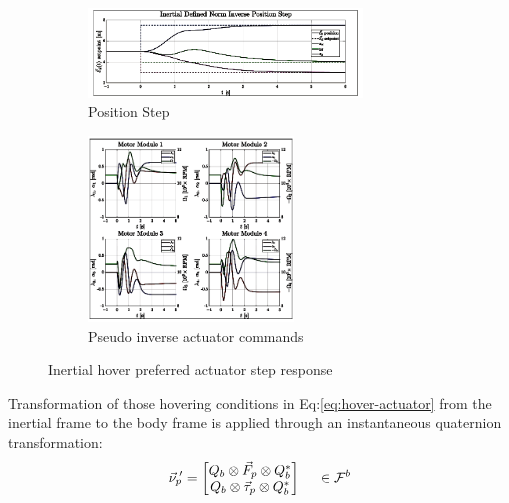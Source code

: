 \begin{figure}[htbp]
\ContinuedFloat
\begin{subfigure}{\textwidth}
\vspace{-2pt}
\centering
\includegraphics[width=0.8\textwidth]{graphs/inertial_norm_position}
\vspace{-6pt}
\caption{Position Step}
\label{fig:inertia_norm_position}
\end{subfigure}
\begin{subfigure}{\textwidth}
\centering
\includegraphics[width=0.6\textwidth]{graphs/inertial_norm_input}
\vspace{-6pt}
\caption{Pseudo inverse actuator commands}
\label{fig:inertia_norm_input}
\end{subfigure}
\vspace{-10pt}
\caption{Inertial hover preferred actuator step response}
\label{fig:inertial-norm-step}
\vspace{-6pt}
\end{figure}
\par
Transformation of those hovering conditions in Eq:\ref{eq:hover-actuator} from the inertial frame to the body frame is applied through an instantaneous quaternion transformation:
\begin{equation}
\vec{\nu}_p\text{}\hspace{-2pt}'=\begin{bmatrix}
Q_b\otimes\vec{F}_p\otimes Q_b^*\\
Q_b\otimes\vec{\tau}_p\otimes Q_b^*
\end{bmatrix}~~~~\in\mathcal{F}^{b}
\end{equation}
